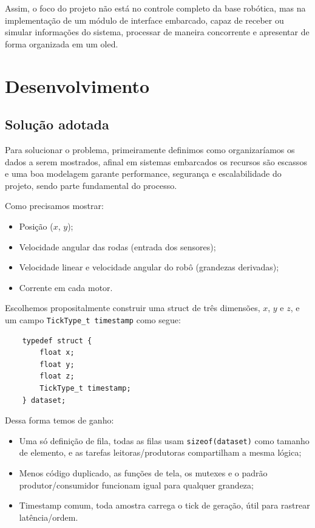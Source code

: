 \documentclass[a4paper,10pt]{article}
\begin{document}
Assim, o foco do projeto não está no controle completo da base robótica, mas na implementação de um módulo de interface embarcado, capaz de receber ou simular informações do sistema, processar de maneira concorrente e apresentar de forma organizada em um oled.

\section{Desenvolvimento}

\subsection{Solução adotada}

Para solucionar o problema, primeiramente definimos como organizaríamos os dados a serem mostrados, afinal em sistemas embarcados os recursos são escassos e uma boa modelagem garante performance, segurança e escalabilidade do projeto, sendo parte fundamental do processo.

Como precisamos mostrar:
\begin{itemize}
    \item Posição ($x$, $y$);
    \item Velocidade angular das rodas (entrada dos sensores);
    \item Velocidade linear e velocidade angular do robô (grandezas derivadas);
    \item Corrente em cada motor.
\end{itemize}

Escolhemos propositalmente construir uma struct de três dimensões, $x$, $y$ e $z$, e um campo \texttt{TickType\_t timestamp} como segue:

\begin{verbatim}
    typedef struct {
        float x;
        float y;
        float z;
        TickType_t timestamp;
    } dataset;
\end{verbatim}

Dessa forma temos de ganho:
\begin{itemize}
    \item Uma só definição de fila, todas as filas usam \texttt{sizeof(dataset)} como tamanho de elemento, e as tarefas leitoras/produtoras compartilham a mesma lógica;
    \item Menos código duplicado, as funções de tela, os mutexes e o padrão produtor/consumidor funcionam igual para qualquer grandeza;
    \item Timestamp comum, toda amostra carrega o tick de geração, útil para rastrear latência/ordem.
\end{itemize}
\end{document}
